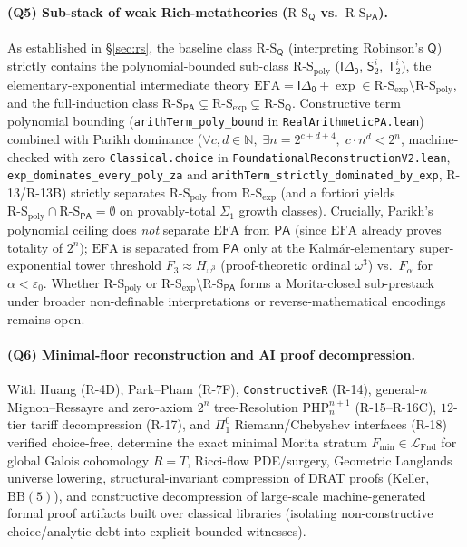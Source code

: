 \documentclass[11pt]{article}
\theoremstyle{plain}
\theoremstyle{definition}
\newcommand{\RS}{\mathrm{R\text{-}S}}
\newcommand{\LFnd}{\mathcal{L}_{\mathrm{Fnd}}}
\newcommand{\PA}{\mathsf{PA}}
\begin{document}
\paragraph{(Q5) Sub-stack of weak Rich-metatheories ($\RS_{\mathsf{Q}}$ vs.\ $\RS_{\PA}$).} As established in \S\ref{sec:rs}, the baseline class $\RS_{\mathsf{Q}}$ (interpreting Robinson's $\mathsf{Q}$) strictly contains the polynomial-bounded sub-class $\RS_{\mathrm{poly}}$ ($\mathsf{I\Delta_0}$, $\mathsf{S}_2^i$, $\mathsf{T}_2^i$), the elementary-exponential intermediate theory $\mathrm{EFA} = \mathsf{I\Delta_0} + \exp \in \RS_{\exp} \setminus \RS_{\mathrm{poly}}$, and the full-induction class $\RS_{\PA} \subsetneq \RS_{\exp} \subsetneq \RS_{\mathsf{Q}}$. Constructive term polynomial bounding (\texttt{arithTerm\_\allowbreak poly\_\allowbreak bound} in \texttt{RealArithmeticPA.lean}) combined with Parikh dominance ($\forall c, d \in \mathbb{N},\; \exists n = 2^{c+d+4},\; c \cdot n^d < 2^n$, machine-checked with zero \texttt{Classical.choice} in \texttt{FoundationalReconstructionV2.lean}, \texttt{exp\_\allowbreak dominates\_\allowbreak every\_\allowbreak poly\_\allowbreak za} and \texttt{arithTerm\_\allowbreak strictly\_\allowbreak dominated\_\allowbreak by\_\allowbreak exp}, R-13/R-13B) strictly separates $\RS_{\mathrm{poly}}$ from $\RS_{\exp}$ (and a fortiori yields $\RS_{\mathrm{poly}} \cap \RS_{\PA} = \emptyset$ on provably-total $\Sigma_1$ growth classes). Crucially, Parikh's polynomial ceiling does \emph{not} separate $\mathrm{EFA}$ from $\PA$ (since $\mathrm{EFA}$ already proves totality of $2^n$); $\mathrm{EFA}$ is separated from $\PA$ only at the Kalm\'ar-elementary super-exponential tower threshold $F_3 \approx H_{\omega^3}$ (proof-theoretic ordinal $\omega^3$) vs.\ $F_\alpha$ for $\alpha < \varepsilon_0$. Whether $\RS_{\mathrm{poly}}$ or $\RS_{\exp} \setminus \RS_{\PA}$ forms a Morita-closed sub-prestack under broader non-definable interpretations or reverse-mathematical encodings~\cite{Simpson2009} remains open.

\paragraph{(Q6) Minimal-floor reconstruction and AI proof decompression.} With Huang (R-4D), Park--Pham (R-7F), \texttt{ConstructiveR} (R-14), general-$n$ Mignon--Ressayre and zero-axiom $2^n$ tree-Resolution $\mathrm{PHP}_n^{n+1}$ (R-15--R-16C), $12$-tier tariff decompression (R-17), and $\Pi^0_1$ Riemann/Chebyshev interfaces (R-18) verified choice-free, determine the exact minimal Morita stratum $F_{\min} \in \LFnd$ for global Galois cohomology $R = T$, Ricci-flow PDE/surgery, Geometric Langlands universe lowering, structural-invariant compression of DRAT proofs (Keller, $\mathrm{BB}(5)$), and constructive decompression of large-scale machine-generated formal proof artifacts built over classical libraries (isolating non-constructive choice/analytic debt into explicit bounded witnesses).
\end{document}

